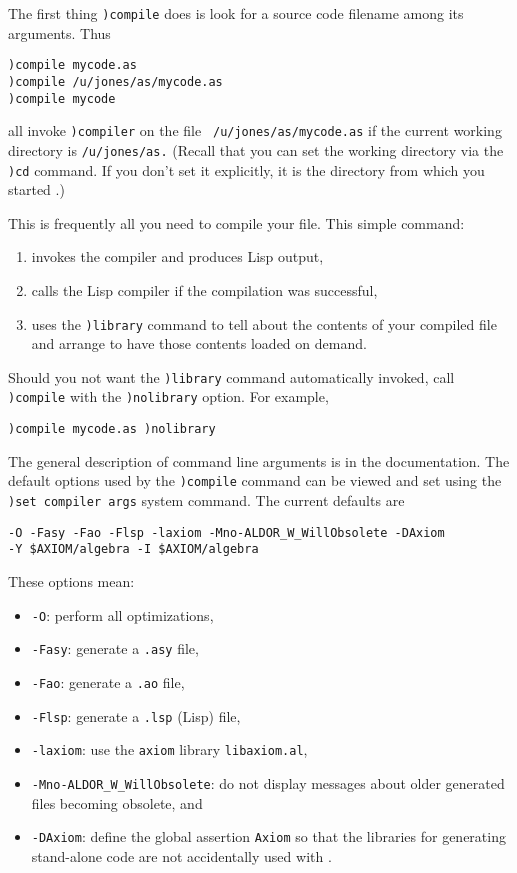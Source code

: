 The first thing {\tt )compile} does is look for a source code
filename among its arguments.
Thus
\begin{verbatim}
)compile mycode.as
)compile /u/jones/as/mycode.as
)compile mycode
\end{verbatim}
all invoke {\tt )compiler} on the file {\tt
/u/jones/as/mycode.as} if the current \Language{} working
directory is {\tt /u/jones/as.} (Recall that you can set the
working directory via the {\tt )cd} command. If you don't set it
explicitly, it is the directory from which you started
\Language{}.)

This is frequently all you need to compile your file.
This simple command:
\begin{enumerate}
\item invokes the \aldor{} compiler and produces Lisp output,
\item calls the Lisp compiler if the \aldor{} compilation was
successful,
\item uses the {\tt )library} command to tell \Language{} about
the contents of your compiled file and arrange to have those
contents loaded on demand.
\end{enumerate}

Should you not want the {\tt )library} command automatically
invoked, call {\tt )compile} with the {\tt )nolibrary} option.
For example,
\begin{verbatim}
)compile mycode.as )nolibrary
\end{verbatim}

The general description of \aldor{} command line arguments is in
the \aldor{} documentation.
The default options used by the {\tt )compile} command can be
viewed and set using the {\tt )set compiler args} \Language{}
system command.
The current defaults are
\begin{verbatim}
-O -Fasy -Fao -Flsp -laxiom -Mno-ALDOR_W_WillObsolete -DAxiom
-Y $AXIOM/algebra -I $AXIOM/algebra
\end{verbatim}
These options mean:
\begin{itemize}
\item {\tt -O}: perform all optimizations,
\item {\tt -Fasy}: generate a {\tt .asy} file,
\item {\tt -Fao}: generate a {\tt .ao} file,
\item {\tt -Flsp}: generate a {\tt .lsp} (Lisp)
file,
\item {\tt -laxiom}: use the {\tt axiom} library {\tt libaxiom.al},
\item {\tt -Mno-ALDOR\_W\_WillObsolete}: do not display messages
about older generated files becoming obsolete, and
\item {\tt -DAxiom}: define the global assertion {\tt Axiom} so that the
\aldor{} libraries for generating stand-alone code
are not accidentally used with \Language{}.
\end{itemize}


